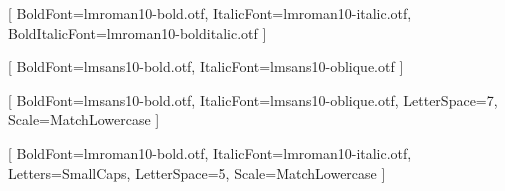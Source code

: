 

\setmainfont{lmroman10-regular.otf}[
  BoldFont=lmroman10-bold.otf,
  ItalicFont=lmroman10-italic.otf,
  BoldItalicFont=lmroman10-bolditalic.otf
]

\setsansfont{lmsans10-regular.otf}[
  BoldFont=lmsans10-bold.otf,
  ItalicFont=lmsans10-oblique.otf
]



\newfontfamily{}[
  BoldFont=lmsans10-bold.otf,
  ItalicFont=lmsans10-oblique.otf,
  LetterSpace=7,
  Scale=MatchLowercase
]

\newfontfamily{}[
  BoldFont=lmroman10-bold.otf,
  ItalicFont=lmroman10-italic.otf,
  Letters=SmallCaps,
  LetterSpace=5,
  Scale=MatchLowercase
]
